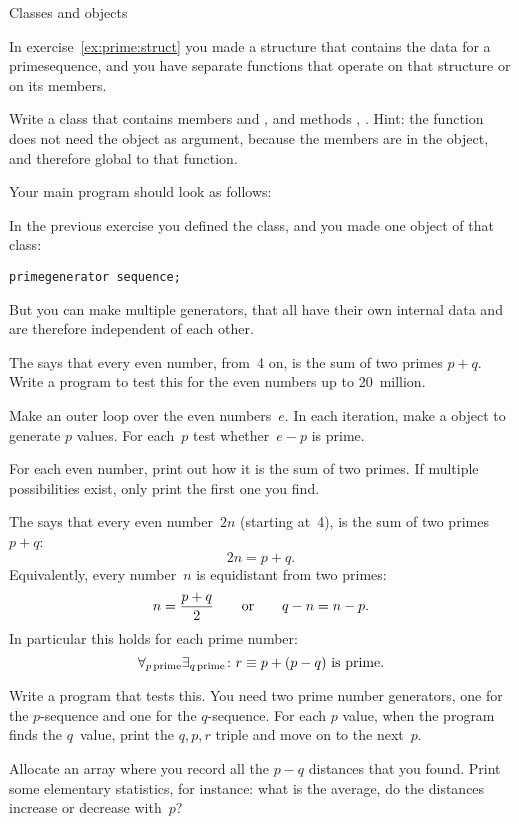  {Classes and objects}

\prerequisite{\ref{sec:object}, \ref{sec:objectf}}

In exercise~\ref{ex:prime:struct} you made a structure that contains
the data for a primesequence, and you have separate functions that
operate on that structure or on its members.

\begin{exercise}
  \label{ex:prime:sequence}
  Write a class  that contains members
   and
  , and methods , .
  {\footnotesize Hint: the
  function  does not need the object as argument,
  because the members are in the object, and therefore global
  to that function.}

  Your main program should look as follows:
\end{exercise}

In the previous exercise you defined the  class, and
you made one object of that class:
\begin{verbatim}
primegenerator sequence;
\end{verbatim}
But you can make multiple generators, that all have their own internal
data and are therefore independent of each other.

\begin{exercise}
  \label{ex:goldbach:conj}
  The  says that every even number,
  from~4 on, is the sum of two primes $p+q$. Write a program to test this
  for the even numbers up to 20~million.

  Make an outer loop over the even numbers~$e$. In each iteration,
  make a  object to generate $p$ values.
  For each~$p$ test whether~$e-p$ is prime.

  For each even number, print out how it is the sum of two primes. If
  multiple possibilities exist, only print the first one you find.
\end{exercise}

\begin{exercise}
  \label{ex:prime:goldbach-pqr}
  The  says that every even number~$2n$
  (starting at~4), is the sum of two primes $p+q$: \[ 2n=p+q.\]
  Equivalently, every number~$n$ is equidistant from two primes:
  \[ n=\frac{p+q}2\qquad\hbox{or}\qquad q-n = n-p.\]
  In particular this holds for each prime number:
  \[ \forall_{p\,\mathrm{prime}}\exists_{q\,\mathrm{prime}}\colon
  \hbox{$r\equiv p+(p-q)$ is prime}. \]

  Write a program that tests this. You need two prime number
  generators, one for the $p$-sequence and one for the $q$-sequence.
  For each $p$ value, 
  when the program finds the $q$~value, print the $q,p,r$ triple and
  move on to the next~$p$.

  Allocate an array where you record all the $p-q$ distances that you
  found. Print some elementary statistics, for instance: what is the average, do the
  distances increase or decrease with~$p$?
\end{exercise}

